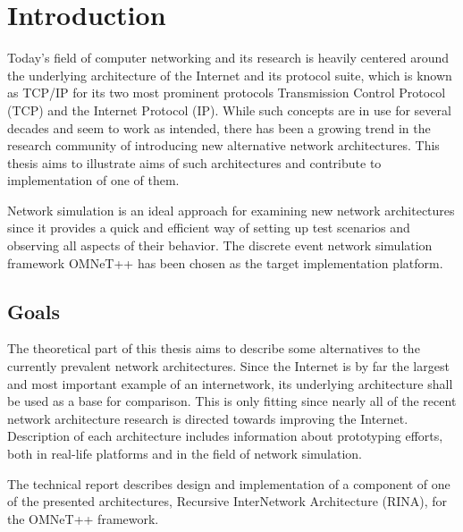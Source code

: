 

\chapter{Introduction}\label{intro}

    Today's field of computer networking and its research is heavily centered around the underlying architecture of the Internet and its protocol suite, which is known as TCP/IP for its two most prominent protocols Transmission Control Protocol (TCP) and the Internet Protocol (IP). While such concepts are in use for several decades and seem to work as intended, there has been a growing trend in the research community of introducing new alternative network architectures. This thesis aims to illustrate aims of such architectures and contribute to implementation of one of them.

    Network simulation is an ideal approach for examining new network architectures since it provides a quick and efficient way of setting up test scenarios and observing all aspects of their behavior. The discrete event network simulation framework OMNeT++ has been chosen as the target implementation platform.

    \section{Goals}

        The theoretical part of this thesis aims to describe some alternatives to the currently prevalent network architectures. Since the Internet is by far the largest and most important example of an internetwork, its underlying architecture shall be used as a base for comparison. This is only fitting since nearly all of the recent network architecture research is directed towards improving the Internet. Description of each architecture includes information about prototyping efforts, both in real-life platforms and in the field of network simulation.

        The technical report describes design and implementation of a component of one of the presented architectures, Recursive InterNetwork Architecture (RINA), for the OMNeT++ framework.

